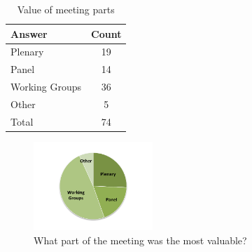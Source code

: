 

\begin{table}[h!]
\centering
\caption{Value of meeting parts}
\label{tab:survey_parts}
\begin{tabular}{|l|c|}
\hline
{\bf Answer} &
{\bf Count} \\ \hline
Plenary &
19 \\
Panel &
14 \\
Working Groups &
36 \\
Other &
5 \\
Total &
74 \\
\hline
\end{tabular}
\end{table}

\begin{figure}[h!]
\includegraphics[width=0.4\textwidth]{figures/SurveyFig4rev}
\caption{What part of the meeting was the most valuable?
\label{fig:SFig4}}
\end{figure}


